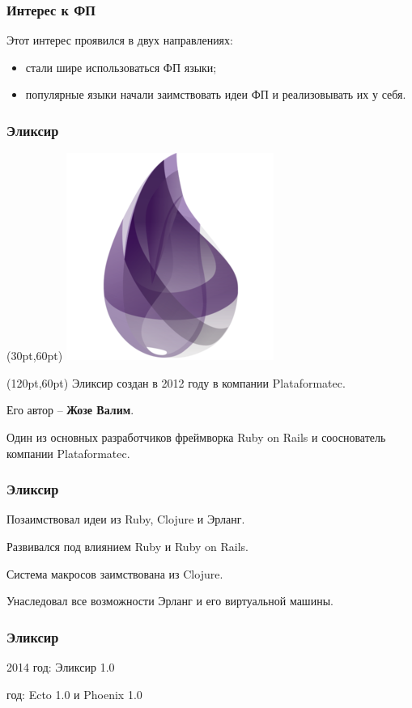 \documentclass[10pt]{beamer}
\begin{document}
\begin{frame}
  \frametitle{Интерес к ФП}
  Этот интерес проявился в двух направлениях:
  \begin{itemize}
  \item стали шире использоваться ФП языки;
  \item популярные языки начали заимствовать идеи ФП и реализовывать их у себя.
  \end{itemize}
\end{frame}

\begin{frame}
  \frametitle{Эликсир}
  \begin{textblock*}{75pt}(30pt,60pt)
    \includegraphics[scale=2.9]{elixir_logo}
  \end{textblock*}
  \begin{textblock*}{220pt}(120pt,60pt)
    Эликсир создан в 2012 году в компании Plataformatec.
    \par \bigskip
    Его автор -- \textbf{Жозе Валим}.
    \par \bigskip
    Один из основных разработчиков фреймворка Ruby on Rails
    и сооснователь компании Plataformatec.
  \end{textblock*}
\end{frame}

\begin{frame}
  \frametitle{Эликсир}
  Позаимствовал идеи из Ruby, Clojure и Эрланг.
  \par \bigskip
  Развивался под влиянием Ruby и Ruby on Rails.
  \par \bigskip
  Система макросов заимствована из Clojure.
  \par \bigskip
  Унаследовал все возможности Эрланг и его виртуальной машины.
\end{frame}

\begin{frame}
  \frametitle{Эликсир}
  2014 год: Эликсир 1.0
  \par {} год: Ecto 1.0 и Phoenix 1.0
\end{frame}
\end{document}
